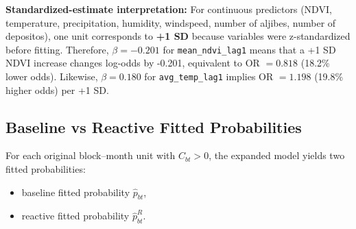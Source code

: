 \documentclass[12pt,a4paper]{article}
\begin{document}
\textbf{Standardized-estimate interpretation:} For continuous predictors (NDVI, temperature, precipitation, humidity, windspeed, number of aljibes, number of depositos), one unit corresponds to \textbf{+1 SD} because variables were z-standardized before fitting. Therefore, $\beta=-0.201$ for \texttt{mean\_ndvi\_lag1} means that a +1 SD NDVI increase changes log-odds by -0.201, equivalent to OR $=0.818$ (18.2\% lower odds). Likewise, $\beta=0.180$ for \texttt{avg\_temp\_lag1} implies OR $=1.198$ (19.8\% higher odds) per +1 SD.

\subsection{Baseline vs Reactive Fitted Probabilities}

For each original block--month unit with $C_{bt}>0$, the expanded model yields two fitted probabilities:
\begin{itemize}
\item baseline fitted probability $\hat{p}_{bt}$,
\item reactive fitted probability $\hat{p}_{bt}^{R}$.
\end{itemize}
\end{document}
